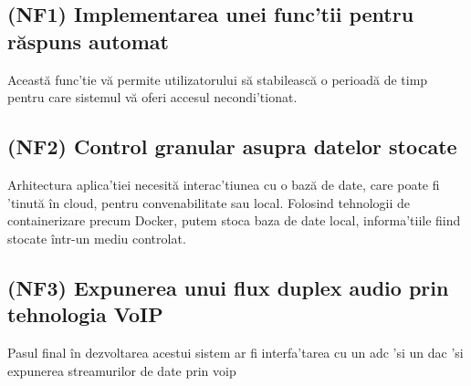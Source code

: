 \subsection{(NF1) Implementarea unei func'tii pentru răspuns automat}

Această func'tie vă permite utilizatorului să stabilească o perioadă de timp pentru care sistemul vă oferi accesul necondi'tionat.

\subsection{(NF2) Control granular asupra datelor stocate}

Arhitectura aplica'tiei necesită interac'tiunea cu o bază de date, care poate fi 'tinută în cloud, pentru convenabilitate sau local.
Folosind tehnologii de containerizare precum Docker, putem stoca baza de date local, informa'tiile fiind stocate într-un mediu controlat.

\subsection{(NF3) Expunerea unui flux duplex audio prin tehnologia VoIP}

Pasul final în dezvoltarea acestui sistem ar fi interfa'tarea cu un \acrfull{adc} 'si un \acrfull{dac} 'si expunerea streamurilor de date prin \acrfull{voip}


